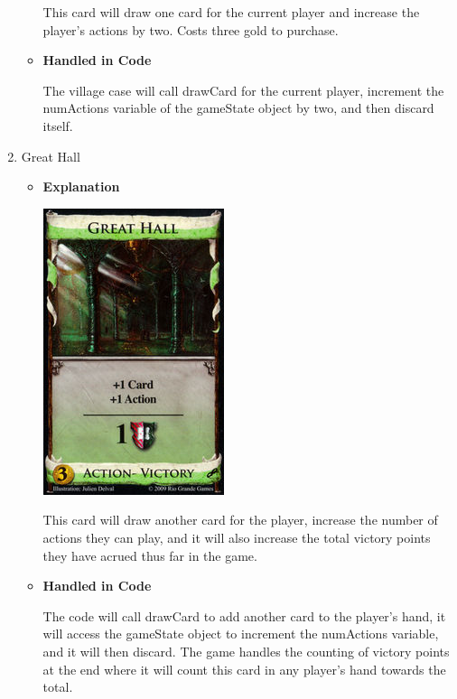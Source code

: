 \documentclass[11pt,letterpaper]{article}
\begin{document}
\begin{enumerate}
\begin{itemize}
        This card will draw one card for the current player
        and increase the player's actions by two. Costs three
        gold to purchase. 

      \item \textbf{Handled in Code}

        The village case will call drawCard for the current 
        player, increment the numActions variable of the
        gameState object by two, and then discard itself. 
    \end{itemize}

  \item Great Hall
    \begin{itemize}
      \item \textbf{Explanation}

        \includegraphics{dominion_greathall.jpg}

        This card will draw another card for the player, increase
        the number of actions they can play, and it will also
        increase the total victory points they have acrued thus
        far in the game.

      \item \textbf{Handled in Code}
      
        The code will call drawCard to add another card to the player's 
        hand, it will access the gameState object to increment the
        numActions variable, and it will then discard. The game handles
        the counting of victory points at the end where it will count
        this card in any player's hand towards the total. 
    \end{itemize}
\end{enumerate}
\end{document}
